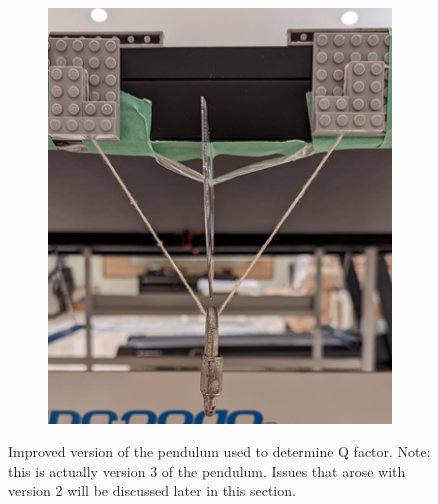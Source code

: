 \documentclass[12pt]{article}
\begin{document}
\begin{figure}[!hptb]
\begin{subfigure}{0.49\textwidth}
        \includegraphics[width=\textwidth]{../figures/exp_setup3_front.png}
    \end{subfigure}
    \caption{\centering Improved version of the pendulum used to determine Q factor. Note: this is actually version 3 of the pendulum. Issues that arose with version 2 will be discussed later in this section.}
    \label{fig:figure 3}
\end{figure}
\newpage
\end{document}
